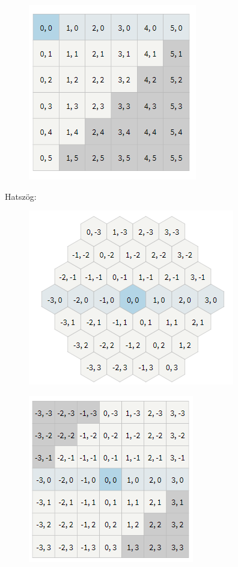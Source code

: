 \begin{figure}[h]
\centering
\includegraphics[scale=0.5]{kepek/img_m4.png}
\caption{}
\label{fig:img_m4}
\end{figure}

\noindent Hatszög:
\begin{figure}[h]
\centering
\includegraphics[scale=0.5]{kepek/img_m5.png}
\caption{}
\label{fig:img_m5}
\end{figure}

\begin{figure}[h]
\centering
\includegraphics[scale=0.5]{kepek/img_m6.png}
\caption{}
\label{fig:img_m6}
\end{figure}

